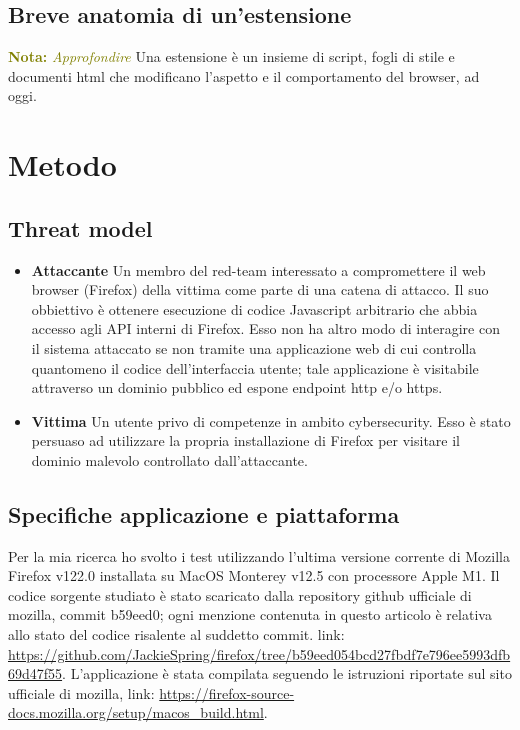 \documentclass[]{./sapthesis/sapthesis}
\newcommand{\MComment}[3]{\textcolor{#3}{ \textbf{#1} \textit{#2}}}
\newcommand{\Nota}[1]{\MComment{Nota:}{#1}{olive}}
\begin{document}
    \section{Breve anatomia di un'estensione}
        \Nota{Approfondire}
        Una estensione è un insieme di script, fogli di stile e documenti html che modificano
        l'aspetto e il comportamento del browser, ad oggi.

\newpage

\chapter{Metodo}
    \section{Threat model}
        \begin{itemize}
            \item \textbf{Attaccante} Un membro del red-team interessato a compromettere
                il web browser (Firefox) della vittima come parte di una catena di attacco.
                Il suo obbiettivo è ottenere esecuzione di codice Javascript arbitrario che abbia
                accesso agli API interni di Firefox.
                Esso non ha altro modo di interagire con il sistema attaccato se non tramite
                una applicazione web di cui controlla quantomeno il codice dell'interfaccia utente;
                tale applicazione è visitabile attraverso un dominio pubblico ed espone endpoint
                http e/o https.

            \item \textbf{Vittima} Un utente privo di competenze in ambito cybersecurity.
                Esso è stato persuaso ad utilizzare la propria installazione di Firefox
                per visitare il dominio malevolo controllato dall'attaccante.
        \end{itemize}

    \section{Specifiche applicazione e piattaforma}
        Per la mia ricerca ho svolto i test utilizzando l'ultima versione corrente di
        Mozilla Firefox v122.0 installata su MacOS Monterey v12.5 con processore Apple M1.
        Il codice sorgente studiato è stato scaricato dalla repository github ufficiale di mozilla,
        commit b59eed0; ogni menzione contenuta in questo articolo è relativa allo stato del codice
        risalente al suddetto commit. link: \url{https://github.com/JackieSpring/firefox/tree/b59eed054bcd27fbdf7e796ee5993dfb69d47f55}. 
        L'applicazione è stata compilata seguendo le istruzioni riportate sul sito
        ufficiale di mozilla, link: \url{https://firefox-source-docs.mozilla.org/setup/macos_build.html}.
\end{document}
